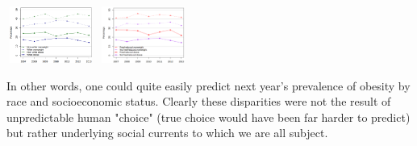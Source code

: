 \begin{multicols}{2}
\vspace{2mm}
\includegraphics[height=70, width=110]{alachua2.png}
\includegraphics[height=70, width=110]{alachua4.png}
\vspace{2mm}


In other words, one could quite easily predict next year's prevalence of obesity by race and socioeconomic status.  Clearly these disparities were not the result of unpredictable human "choice" (true choice would have been far harder to predict) but rather underlying social currents to which we are all subject.


\end{multicols}

